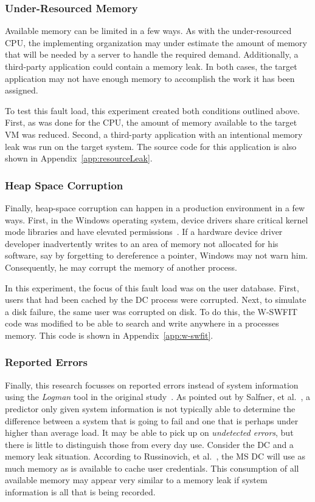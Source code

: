 \subsubsection{Under-Resourced Memory} \label{sec:extUnderResourcedMem}
Available memory can be limited in a few ways.  As with the under-resourced
\ac{CPU}, the implementing organization may under estimate the amount of memory
that will be needed by a server to handle the required demand.  Additionally, a
third-party application could contain a memory leak.  In both cases, the target
application may not have enough memory to accomplish the work it has been
assigned.

To test this fault load, this experiment created both conditions outlined
above. First, as was done for the \ac{CPU}, the amount of memory available to
the target \ac{VM} was reduced.  Second, a third-party application with an
intentional memory leak was run on the target system.  The source code for this
application is also shown in Appendix~\ref{app:resourceLeak}.

\subsubsection{Heap Space Corruption} \label{sec:extHeapSpaceCorrupt}
Finally, heap-space corruption can happen in a production environment in a few
ways.  First, in the Windows operating system, device drivers share critical
kernel mode libraries and have elevated permissions~\cite{russinovich2009}.  If
a hardware device driver developer inadvertently writes to an area of memory
not allocated for his software, say by forgetting to dereference a pointer,
Windows may not warn him.  Consequently, he may corrupt the memory of another
process.

In this experiment, the focus of this fault load was on the user database.
First, users that had been cached by the \ac{DC} process were corrupted.  Next,
to simulate a disk failure, the same user was corrupted on disk.  To do this,
the \ac{W-SWFIT} code was modified to be able to search and write anywhere in a
processes memory.  This code is shown in Appendix~\ref{app:w-swfit}.

\subsubsection{Reported Errors} \label{sec:extReportedErrors}
Finally, this research focusses on reported errors instead of system
information using the \emph{Logman} tool in the original
study~\cite{irrera2015}.  As pointed out by Salfner, et
al.~\cite{salfnerSurvey}, a predictor only given system information is not
typically able to determine the difference between a system that is going to
fail and one that is perhaps under higher than average load.  It may be able to
pick up on \emph{undetected errors}, but there is little to distinguish those
from every day use.  Consider the \ac{DC} and a memory leak situation.
According to Russinovich, et al.~\cite{russinovich2009}, the \ac{MS} \ac{DC}
will use as much memory as is available to cache user credentials.  This
consumption of all available memory may appear very similar to a memory leak if
system information is all that is being recorded.

